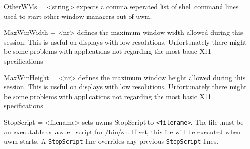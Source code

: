 \documentclass[10pt,a4paper]{article}
\newenvironment{ttdesc}[1]{
   \begin{list}{}{
          \renewcommand{\makelabel}[1]{\texttt{##1\hfill}}}}{\end{list}}
\begin{document}
\begin{ttdesc}{description}
\item[OtherWMs = <string>] expects a comma seperated list of shell command lines used to start other window managers out of uwm.

\item[MaxWinWidth = <nr>] defines the maximum window width allowed during this session. This is useful on displays with low resolutions. Unfortunately there might be some problems with applications not regarding the most basic X11 specifications.

\item[MaxWinHeight = <nr>] defines the maximum window height allowed during this session. This is useful on displays with low resolutions. Unfortunately there might be some problems with applications not regarding the most basic X11 specifications.

\item[StopScript = <filename>] sets uwms StopScript to \texttt{<filename>}. The file must be an executable or a shell script for /bin/sh. If set, this file will be executed when uwm starts. A \texttt{StopScript} line overrides any previous \texttt{StopScript} lines.


\end{ttdesc}
\end{document}
